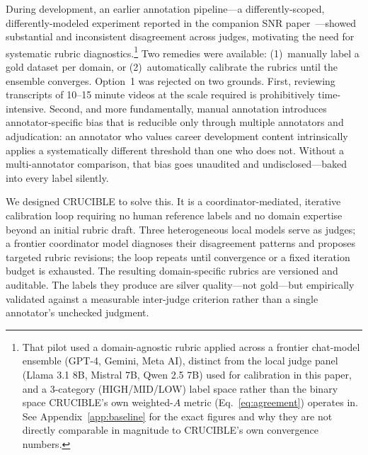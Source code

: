 \documentclass[11pt]{article}
\begin{document}
During development, an earlier annotation pipeline---a differently-scoped,
differently-modeled experiment reported in the companion SNR
paper~\cite{dasSNR2026}---showed substantial and inconsistent disagreement
across judges, motivating the need for systematic rubric
diagnostics.\footnote{That pilot used a domain-agnostic rubric applied
across a frontier chat-model ensemble (GPT-4, Gemini, Meta AI), distinct
from the local judge panel (Llama 3.1 8B, Mistral 7B, Qwen 2.5 7B) used for
calibration in this paper, and a 3-category (HIGH/MID/LOW) label space
rather than the binary space CRUCIBLE's own weighted-$A$ metric
(Eq.~\ref{eq:agreement}) operates in. See Appendix~\ref{app:baseline} for the exact figures and why
they are not directly comparable in magnitude to CRUCIBLE's own convergence
numbers.}
Two remedies were available: (1)~manually label a gold dataset per domain, or
(2)~automatically calibrate the rubrics until the ensemble converges.
Option~1 was rejected on two grounds. First, reviewing transcripts of 10--15
minute videos at the scale required is prohibitively time-intensive. Second,
and more fundamentally, manual annotation introduces annotator-specific bias that is reducible only through
multiple annotators and adjudication:
an annotator who values career development content intrinsically applies a
systematically different threshold than one who does not. Without a multi-annotator comparison, that bias goes unaudited and undisclosed---baked into every label silently.

We designed CRUCIBLE to solve this. It is a coordinator-mediated, iterative
calibration loop requiring no human reference labels and no domain expertise
beyond an initial rubric draft. Three heterogeneous local models serve as
judges; a frontier coordinator model diagnoses their disagreement patterns and
proposes targeted rubric revisions; the loop repeats until convergence or a fixed iteration budget is exhausted. The resulting domain-specific rubrics are versioned and auditable.
The labels they produce are silver quality---not gold---but empirically
validated against a measurable inter-judge criterion rather than a single
annotator's unchecked judgment.
\end{document}
